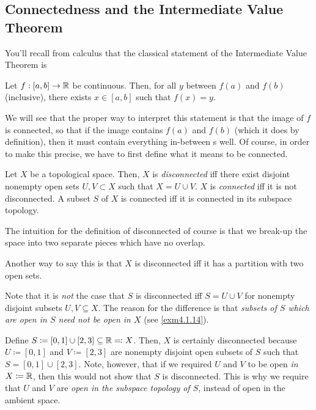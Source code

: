 \subsection{Connectedness and the Intermediate Value Theorem}

You'll recall from calculus that the classical statement of the Intermediate Value Theorem is
\begin{footnoteequation}
\begin{textequation}
Let $f:[a,b]\rightarrow \mathbb{R}$ be continuous.  Then, for all $y$ between $f(a)$ and $f(b)$ (inclusive), there exists $x\in [a,b]$ such that $f(x)=y$.
\end{textequation}
\end{footnoteequation}
We will see that the proper way to interpret this statement is that the image of $f$ is connected, so that if the image contains $f(a)$ and $f(b)$ (which it does by definition), then it must contain everything in-between s well.  Of course, in order to make this precise, we have to first define what it means to be connected.
\begin{dfn}\label{Connected}
Let $X$ be a topological space.  Then, $X$ is \emph{disconnected} iff there exist disjoint nonempty open sets $U,V\subset X$ such that $X=U\cup V$.  $X$ is \emph{connected} iff it is not disconnected.  A subset $S$ of $X$ is connected iff it is connected in its subspace topology.
\begin{rmk}
The intuition for the definition of disconnected of course is that we break-up the space into two separate pieces which have no overlap.
\end{rmk}
\begin{rmk}
Another way to say this is that $X$ is disconnected iff it has a partition with two open sets.
\end{rmk}
\begin{rmk}
Note that it is \emph{not} the case that $S$ is disconnected iff $S=U\cup V$ for nonempty disjoint subsets $U,V\subseteq X$.  The reason for the difference is that \emph{subsets of $S$ which are open in $S$ need not be open in $X$} (see \cref{exm4.1.14}).
\end{rmk}
\end{dfn}
\begin{exm}
Define $S\coloneqq [0,1]\cup [2,3]\subseteq \mathbb{R} \eqqcolon X$.  Then, $X$ is certainly disconnected because $U\coloneqq [0,1]$ and $V\coloneqq [2,3]$ are nonempty disjoint open subsets of $S$ such that $S=[0,1]\cup [2,3]$.  Note, however, that if we required $U$ and $V$ to be open \emph{in $X\coloneqq \mathbb{R}$}, then this would not show that $S$ is disconnected.  This is why we require that $U$ and $V$ are \emph{open in the subspace topology of $S$}, instead of open in the ambient space.
\end{exm}
